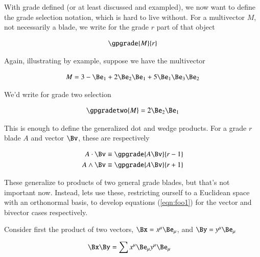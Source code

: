 With grade defined (or at least discussed and exampled), we now want to define the grade selection notation, which is hard to live without.  For a multivector $M$, not necessarily a blade, we write for the grade $r$ part of that object

\begin{align}\label{eqn:foo3}
\gpgrade{M}{r}
\end{align}

Again, illustrating by example, suppose we have the multivector

\begin{align*}
M = 3 -\Be_1 + 2 \Be_2 \Be_1 + 5 \Be_1 \Be_3 \Be_2 
\end{align*}

We'd write for grade two selection

\begin{align*}
\gpgradetwo{M} = 2 \Be_2 \Be_1
\end{align*}

This is enough to define the generalized dot and wedge products.  For a grade $r$ blade $A$ and vector $\Bv$, these are respectively

\begin{align}\label{eqn:foo4}
A \cdot \Bv &\equiv \gpgrade{A \Bv}{r-1} \\
A \wedge \Bv &\equiv \gpgrade{A \Bv}{r+1} 
\end{align}

These generalize to products of two general grade blades, but that's not important now.  Instead, lets use these, restricting ourself to a Euclidean space with an orthonormal basis, to develop equations (\ref{eqn:foo1}) for the vector and bivector cases respectively.

Consider first the product of two vectors, $\Bx = x^\mu \Be_\mu$, and $\By = y^\mu \Be_\mu$

\begin{align*}
\Bx \By &= \sum x^\mu \Be_\mu y^\mu \Be_\mu
\end{align*}

\EndNoBibArticle
